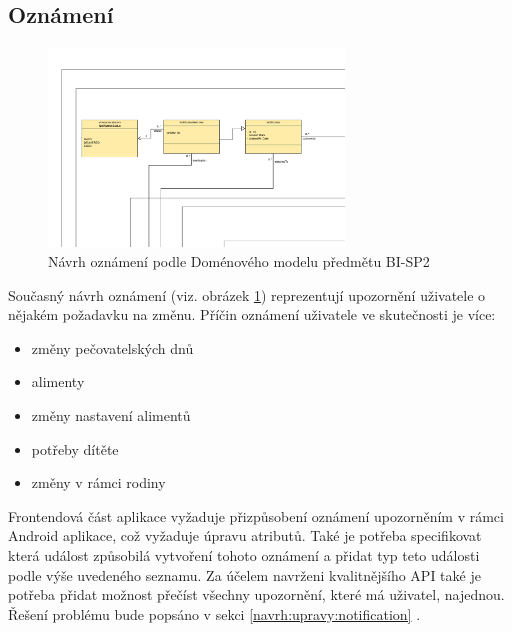          \subsection{Oznámení}
            \begin{figure}\centering
	            \includegraphics[width=0.7\textwidth]{pdfs/Notification1}
	            \caption[Předchozí návrh oznámení]{Návrh oznámení podle Doménového modelu předmětu BI-SP2}\label{image:notification1}
            \end{figure}
            Současný návrh oznámení (viz. obrázek \ref{image:notification1}) reprezentují upozornění uživatele o nějakém požadavku na změnu. Příčin oznámení uživatele ve skutečnosti je více:
            \begin{itemize}
                \item změny pečovatelských dnů
                \item alimenty
                \item změny nastavení alimentů
                \item potřeby dítěte
                \item změny v rámci rodiny
            \end{itemize}
            Frontendová část aplikace vyžaduje přizpůsobení oznámení upozorněním v rámci Android aplikace, což vyžaduje úpravu atributů. Také je potřeba specifikovat která událost způsobilá vytvoření tohoto oznámení a přidat typ teto události podle výše uvedeného seznamu. Za účelem navrženi kvalitnějšího API také je potřeba přidat možnost přečíst všechny upozornění, které má uživatel, najednou. Řešení problému bude popsáno v sekci \ref{navrh:upravy:notification} . 
            
            
